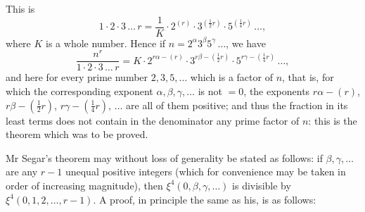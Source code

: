 \documentclass[11pt]{article}
\begin{document}
This is
\[ 1\cdot 2\cdot 3\,\ldots\,r = \frac{1}{K}\cdot 2^{(r)}\cdot 3^{(\frac{1}{2}r)}\cdot 5^{(\frac{1}{4}r)}\,\ldots, \]
where $K$ is a whole number. Hence if $n = 2^\alpha 3^\beta 5^\gamma\,\ldots$, we have
\[ \frac{n^r}{1\cdot 2\cdot 3\,\ldots\,r} = K\cdot 2^{r\alpha - (r)}\cdot 3^{r\beta - (\frac{1}{2}r)}\cdot 5^{r\gamma - (\frac{1}{4}r)}\,\ldots, \]
and here for every prime number $2, 3, 5, \ldots$ which is a factor of $n$, that is, for which the corresponding exponent $\alpha,\beta,\gamma,\ldots$ is not $=0$, the exponents $r\alpha-(r)$, $r\beta-(\tfrac{1}{2}r)$, $r\gamma-(\tfrac{1}{4}r),\,\ldots$ are all of them positive; and thus the fraction in its least terms does not contain in the denominator any prime factor of $n$: this is the theorem which was to be proved.

Mr Segar's theorem may without loss of generality be stated as follows: if $\beta,\gamma,\ldots$ are any $r-1$ unequal positive integers (which for convenience may be taken in order of increasing magnitude), then $\xi^4(0,\beta,\gamma,\ldots)$ is divisible by $\xi^4(0,1,2,\ldots,r-1)$. A proof, in principle the same as his, is as follows:
\end{document}
